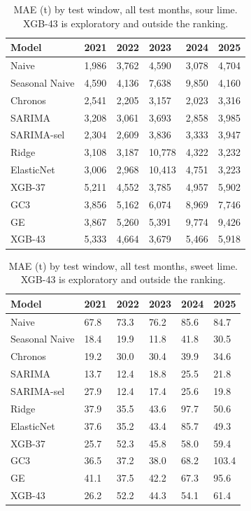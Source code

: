 \begin{table}[H]
\centering
\small
\caption{MAE (t) by test window, all test months, sour lime. XGB-43 is exploratory and outside the ranking.}
\label{tab:T05_MAE_P75_por_ventana_sutil}
\begin{tabular}{llllll}
\toprule
Model & 2021 & 2022 & 2023 & 2024 & 2025 \\
\midrule
Naive & 1,986 & 3,762 & 4,590 & 3,078 & 4,704 \\
Seasonal Naive & 4,590 & 4,136 & 7,638 & 9,850 & 4,160 \\
Chronos & 2,541 & 2,205 & 3,157 & 2,023 & 3,316 \\
SARIMA & 3,208 & 3,061 & 3,693 & 2,858 & 3,985 \\
SARIMA-sel & 2,304 & 2,609 & 3,836 & 3,333 & 3,947 \\
Ridge & 3,108 & 3,187 & 10,778 & 4,322 & 3,232 \\
ElasticNet & 3,006 & 2,968 & 10,413 & 4,751 & 3,223 \\
XGB-37 & 5,211 & 4,552 & 3,785 & 4,957 & 5,902 \\
GC3 & 3,856 & 5,162 & 6,074 & 8,969 & 7,746 \\
GE & 3,867 & 5,260 & 5,391 & 9,774 & 9,426 \\
XGB-43 & 5,333 & 4,664 & 3,679 & 5,466 & 5,918 \\
\bottomrule
\end{tabular}
\end{table}

\begin{table}[H]
\centering
\small
\caption{MAE (t) by test window, all test months, sweet lime. XGB-43 is exploratory and outside the ranking.}
\label{tab:T05_MAE_P75_por_ventana_dulce}
\begin{tabular}{llllll}
\toprule
Model & 2021 & 2022 & 2023 & 2024 & 2025 \\
\midrule
Naive & 67.8 & 73.3 & 76.2 & 85.6 & 84.7 \\
Seasonal Naive & 18.4 & 19.9 & 11.8 & 41.8 & 30.5 \\
Chronos & 19.2 & 30.0 & 30.4 & 39.9 & 34.6 \\
SARIMA & 13.7 & 12.4 & 18.8 & 25.5 & 21.8 \\
SARIMA-sel & 27.9 & 12.4 & 17.4 & 25.6 & 19.8 \\
Ridge & 37.9 & 35.5 & 43.6 & 97.7 & 50.6 \\
ElasticNet & 37.6 & 35.2 & 43.4 & 85.7 & 49.3 \\
XGB-37 & 25.7 & 52.3 & 45.8 & 58.0 & 59.4 \\
GC3 & 36.5 & 37.2 & 38.0 & 68.2 & 103.4 \\
GE & 41.1 & 37.5 & 42.2 & 67.3 & 95.6 \\
XGB-43 & 26.2 & 52.2 & 44.3 & 54.1 & 61.4 \\
\bottomrule
\end{tabular}
\end{table}


